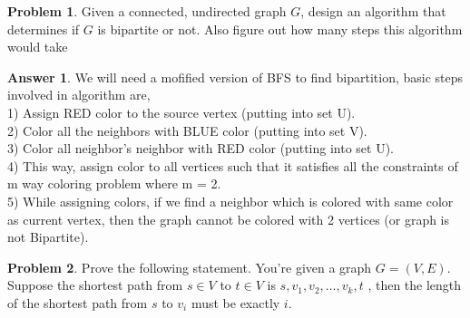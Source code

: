 \documentclass{article}
\theoremstyle{definition}
\newtheorem{Q}{Problem}
\newtheorem{A}{Answer}
\begin{document}
\pagebreak
\begin{Q}
Given a connected, undirected graph $G$, design an algorithm that determines if $G$ is bipartite or not. Also figure out how many steps this algorithm would take
\end{Q}
\begin{A}
We will need a mofified version of BFS to find bipartition, basic steps involved in algorithm are,\\
1) Assign RED color to the source vertex (putting into set U).\\
2) Color all the neighbors with BLUE color (putting into set V).\\
3) Color all neighbor’s neighbor with RED color (putting into set U).\\
4) This way, assign color to all vertices such that it satisfies all the constraints of m way coloring problem where m = 2.\\
5) While assigning colors, if we find a neighbor which is colored with same color as current vertex, then the graph cannot be colored with 2 vertices (or graph is not Bipartite).\\

\end{A}
\pagebreak
\begin{Q}
Prove the following statement. You're given a graph $G=(V,E)$. Suppose the shortest path from $s\in V$ to $t\in V$ is $s,v_1,v_2,\ldots ,v_k,t$ , then the length of the shortest path from $s$ to $v_i$ must be exactly $i$.
\end{Q}
\end{document}
